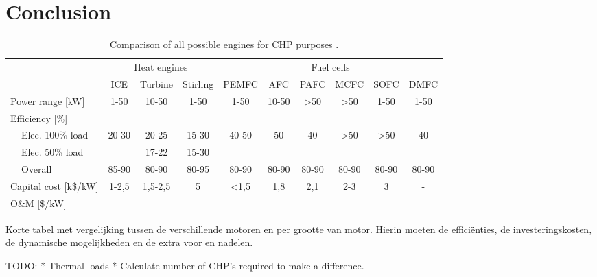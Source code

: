 \section{Conclusion}
\setlength{\tabcolsep}{5pt}
\begin{table}[h]\footnotesize
  \setlength{\tabcolsep}{5pt}
  \caption{Comparison of all possible engines for CHP purposes \cite{Kirubakaran2009,Onovwiona2006}.}
  \begin{center}
  \begin{tabular}{p{0pt} l | *{3}{c} | *{6}{c}}
  \multicolumn{2}{c|}{} & \multicolumn{3}{|c|}{Heat engines} & \multicolumn{6}{|c}{Fuel cells} \\
  \multicolumn{2}{c|}{} & ICE & Turbine & Stirling & PEMFC & AFC & PAFC & MCFC & SOFC & DMFC \\
  \hline
  \multicolumn{2}{l|}{Power range [kW]}     & 1-50&10-50&1-50&1-50&10-50&>50&>50&1-50&1-50 \\
  \multicolumn{2}{l|}{Efficiency [\%]}      & & & & & & & & & \\
  & Elec. 100\% load                        & 20-30&20-25&15-30&40-50&50&40&>50&>50&40 \\
  & Elec. 50\% load                         & & 17-22&15-30& & & & & & \\
  & Overall                                 & 85-90&80-90&80-95&80-90&80-90&80-90&80-90&80-90&80-90 \\
  \multicolumn{2}{l|}{Capital cost [k\$/kW]} & 1-2,5&1,5-2,5&5&<1,5&1,8&2,1&2-3&3&- \\
  \multicolumn{2}{l|}{O\&M [\$/kW]}         & & & & & & & & & \\
  \end{tabular}
  \end{center}
  \setlength{\tabcolsep}{6pt}
\end{table}

Korte tabel met vergelijking tussen de verschillende motoren en per grootte van motor. Hierin moeten de effici\"enties, de investeringskosten, de dynamische mogelijkheden en de extra voor en nadelen.

TODO:
* Thermal loads
* Calculate number of CHP's required to make a difference.